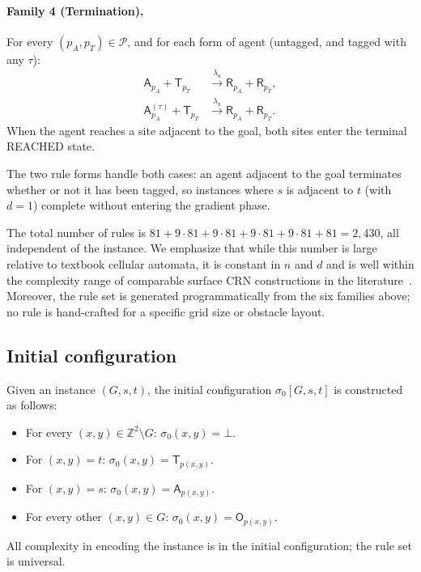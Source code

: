 \documentclass[11pt]{article}
\theoremstyle{plain}
\theoremstyle{definition}
\theoremstyle{remark}
\newcommand{\Z}{\mathbb{Z}}
\begin{document}
\paragraph{Family 4 (Termination).} For every $(p_A, p_T) \in \mathcal{P}$, and for each form of agent (untagged, and tagged with any $\tau$):
\begin{align*}
\mathsf{A}_{p_A} + \mathsf{T}_{p_T} &\xrightarrow{\lambda_a} \mathsf{R}_{p_A} + \mathsf{R}_{p_T}, \\
\mathsf{A}^{(\tau)}_{p_A} + \mathsf{T}_{p_T} &\xrightarrow{\lambda_a} \mathsf{R}_{p_A} + \mathsf{R}_{p_T}.
\end{align*}
When the agent reaches a site adjacent to the goal, both sites enter the terminal REACHED state.

The two rule forms handle both cases: an agent adjacent to the goal terminates whether or not it has been tagged, so instances where $s$ is adjacent to $t$ (with $d = 1$) complete without entering the gradient phase.

The total number of rules is $81 + 9 \cdot 81 + 9 \cdot 81 + 9 \cdot 81 + 9 \cdot 81 + 81 = 2{,}430$, all independent of the instance. We emphasize that while this number is large relative to textbook cellular automata, it is constant in $n$ and $d$ and is well within the complexity range of comparable surface CRN constructions in the literature~\cite{clamons2020}. Moreover, the rule set is generated programmatically from the six families above; no rule is hand-crafted for a specific grid size or obstacle layout.

\subsection{Initial configuration}
\label{subsec:init}

Given an instance $(G, s, t)$, the initial configuration $\sigma_0[G, s, t]$ is constructed as follows:
\begin{itemize}
    \item For every $(x,y) \in \Z^2 \setminus G$: $\sigma_0(x,y) = \bot$.
    \item For $(x,y) = t$: $\sigma_0(x,y) = \mathsf{T}_{p(x,y)}$.
    \item For $(x,y) = s$: $\sigma_0(x,y) = \mathsf{A}_{p(x,y)}$.
    \item For every other $(x,y) \in G$: $\sigma_0(x,y) = \mathsf{O}_{p(x,y)}$.
\end{itemize}
All complexity in encoding the instance is in the initial configuration; the rule set is universal.
\end{document}
